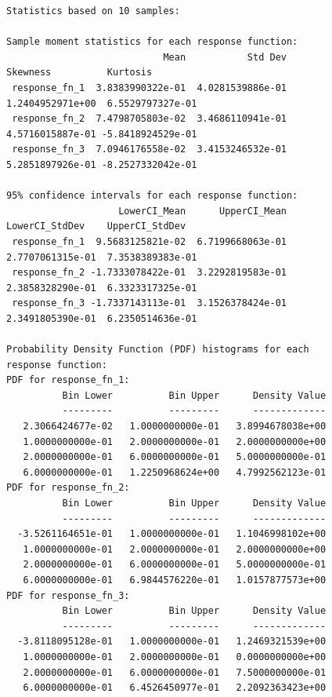 \begin{figure}[htbp!]
\centering
\begin{bigbox}
\begin{footnotesize}
\begin{verbatim}
Statistics based on 10 samples:

Sample moment statistics for each response function:
                            Mean           Std Dev          Skewness          Kurtosis
 response_fn_1  3.8383990322e-01  4.0281539886e-01  1.2404952971e+00  6.5529797327e-01
 response_fn_2  7.4798705803e-02  3.4686110941e-01  4.5716015887e-01 -5.8418924529e-01
 response_fn_3  7.0946176558e-02  3.4153246532e-01  5.2851897926e-01 -8.2527332042e-01

95% confidence intervals for each response function:
                    LowerCI_Mean      UpperCI_Mean    LowerCI_StdDev    UpperCI_StdDev
 response_fn_1  9.5683125821e-02  6.7199668063e-01  2.7707061315e-01  7.3538389383e-01
 response_fn_2 -1.7333078422e-01  3.2292819583e-01  2.3858328290e-01  6.3323317325e-01
 response_fn_3 -1.7337143113e-01  3.1526378424e-01  2.3491805390e-01  6.2350514636e-01

Probability Density Function (PDF) histograms for each response function:
PDF for response_fn_1:
          Bin Lower          Bin Upper      Density Value
          ---------          ---------      -------------
   2.3066424677e-02   1.0000000000e-01   3.8994678038e+00
   1.0000000000e-01   2.0000000000e-01   2.0000000000e+00
   2.0000000000e-01   6.0000000000e-01   5.0000000000e-01
   6.0000000000e-01   1.2250968624e+00   4.7992562123e-01
PDF for response_fn_2:
          Bin Lower          Bin Upper      Density Value
          ---------          ---------      -------------
  -3.5261164651e-01   1.0000000000e-01   1.1046998102e+00
   1.0000000000e-01   2.0000000000e-01   2.0000000000e+00
   2.0000000000e-01   6.0000000000e-01   5.0000000000e-01
   6.0000000000e-01   6.9844576220e-01   1.0157877573e+00
PDF for response_fn_3:
          Bin Lower          Bin Upper      Density Value
          ---------          ---------      -------------
  -3.8118095128e-01   1.0000000000e-01   1.2469321539e+00
   1.0000000000e-01   2.0000000000e-01   0.0000000000e+00
   2.0000000000e-01   6.0000000000e-01   7.5000000000e-01
   6.0000000000e-01   6.4526450977e-01   2.2092363423e+00


\end{verbatim}
\end{footnotesize}
\end{bigbox}
\end{figure}
